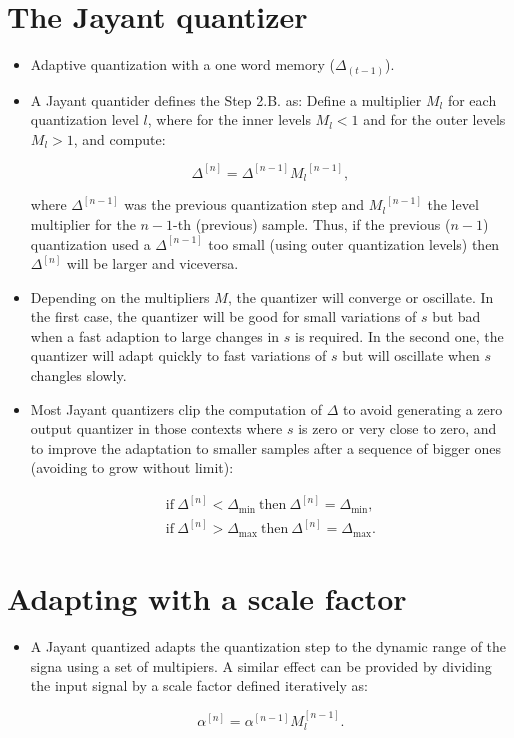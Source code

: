 \section{The Jayant quantizer~\cite{jayant1974digital}}
\begin{itemize}
\item
  Adaptive quantization with a one word memory (\(\Delta_{(t-1)}\)).
\item
  A Jayant quantider defines the Step 2.B. as: Define a multiplier
  \(M_l\) for each quantization level \(l\), where for the inner levels
  \(M_l<1\) and for the outer levels \(M_l>1\), and compute:

  \[
    \Delta^{[n]} = \Delta^{[n-1]}{M_l}^{[n-1]},
  \]

  where \(\Delta^{[n-1]}\) was the previous quantization step and
  \({M_l}^{[n-1]}\) the level multiplier for the \(n-1\)-th (previous)
  sample. Thus, if the previous (\(n-1\)) quantization used a
  \(\Delta^{[n-1]}\) too small (using outer quantization levels) then
  \(\Delta^{[n]}\) will be larger and viceversa.
\item
  Depending on the multipliers \(M\), the quantizer will converge or
  oscillate. In the first case, the quantizer will be good for small
  variations of \(s\) but bad when a fast adaption to large changes in
  \(s\) is required. In the second one, the quantizer will adapt quickly
  to fast variations of \(s\) but will oscillate when \(s\) changles
  slowly.
\item
  Most Jayant quantizers clip the computation of \(\Delta\) to avoid
  generating a zero output quantizer in those contexts where \(s\) is
  zero or very close to zero, and to improve the adaptation to smaller
  samples after a sequence of bigger ones (avoiding to grow without
  limit):

  \[
  \begin{array}{ll}
    \text{if}~\Delta^{[n]}<\Delta_\text{min}~\text{then}~\Delta^{[n]} = \Delta_\text{min},\\
    \text{if}~\Delta^{[n]}>\Delta_\text{max}~\text{then}~\Delta^{[n]} = \Delta_\text{max}.
  \end{array}
  \]
\end{itemize}

\section{Adapting with a scale factor}
\begin{itemize}
\item
  A Jayant quantized adapts the quantization step to the dynamic range
  of the signa using a set of multipiers. A similar effect can be
  provided by dividing the input signal by a scale factor defined
  iteratively as:

  \begin{equation}
    \alpha^{[n]} = \alpha^{[n-1]}M_l^{[n-1]}.
  \end{equation}
\end{itemize}

